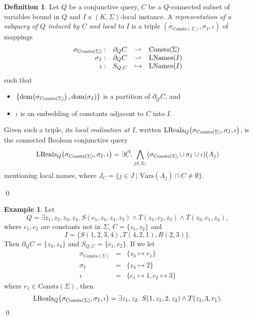 \documentclass[12pt]{report}
\theoremstyle{plain}
\theoremstyle{definition}
\newtheorem{definition}[theorem]{Definition}
\newtheorem{example}[theorem]{Example}
\def\Vars{{\mathrm{Vars}}}
\def\Consts{{\mathrm{Consts}}}
\newcommand{\dom}[1]{\ensuremath{\normalfont{\operatorname{dom}}\!\left( #1 \right)}}
\newcommand{\LNames}[1]{\ensuremath{\normalfont{\textrm{LNames}}\!\left( #1 \right)}}
\newcommand{\LRealz}[2]{\ensuremath{\normalfont{\textrm{LRealz}}_{ #1 }\!\left( #2 \right)}}
\begin{document}
\begin{definition}
  Let $Q$ be a conjunctive query, $C$ be a $Q$-connected subset of variables bound in $Q$ and $I$ a $(K, \Sigma)$-local instance. A \emph{representation of a subquery of $Q$ induced by $C$ and local to $I$} is a triple $(\sigma_{\Consts(\Sigma)}, \sigma_I, \iota)$ of mappings
  \[\begin{array}{rccl}
    \sigma_{\Consts(\Sigma)}: & \partial_Q C &\rightharpoonup& \Consts(\Sigma) \\
    \sigma_I: & \partial_Q C &\rightharpoonup& \LNames{I} \\
    \iota: & S_{Q,C} &\hookrightarrow& \LNames{I}
  \end{array}\]
  such that \begin{itemize}
    \item $\{ \dom{\sigma_{\Consts(\Sigma)}}, \dom{\sigma_I} \}$ is a partition of $\partial_Q C$, and
    \item $\iota$ is an embedding of constants adjacent to $C$ into $I$.
  \end{itemize}

  Given such a triple, its \emph{local realisation at $I$}, written $\LRealz{Q}{\sigma_{\Consts(\Sigma)}, \sigma_I, \iota}$, is the connected Boolean conjunctive query $$
  \LRealz{Q}{\sigma_{\Consts(\Sigma)}, \sigma_I, \iota} = \exists \vec{C}. \bigwedge_{j \in J_C} (\sigma_{\Consts(\Sigma)} \cup \sigma_I \cup \iota)(A_j)
  $$
  mentioning local names, where $J_C = \{ j \in J \mid \Vars(A_j) \cap C \neq \emptyset \}$.

  \qed
\end{definition}

\begin{example}
\label{example:local-realisation-of-subquery-representation}
  Let
  $$
    Q = \exists z_1,z_2,z_3,z_4.\ S(c_1, z_1, z_4, z_2) \wedge T(z_1, c_2, z_3) \wedge T(z_3, c_1, z_4),
  $$
  where $c_1, c_2$ are constants not in $\Sigma$, $C = \{z_1, z_2\}$ and $$I = \{ S(1, 2, 3, 4), T(4, 2, 1), R(2, 3) \}.$$
  Then $\partial_Q C = \{ z_3, z_4 \}$ and $S_{Q,C} = \{c_1, c_2\}$. If we let
  \[\begin{array}{rcl}
    \sigma_{\Consts(\Sigma)} &=& \{ z_3 \mapsto r_1 \} \\
    \sigma_I &=& \{ z_4 \mapsto 2 \} \\
    \iota &=& \{ c_1 \mapsto 1, c_2 \mapsto 3 \}
  \end{array}\]
  where $r_1 \in \Consts(\Sigma)$, then $$
  \LRealz{Q}{\sigma_{\Consts(\Sigma)}, \sigma_I, \iota} = \exists z_1, z_2.\ S(1, z_1, 2, z_2) \wedge T(z_1, 3, r_1).
  $$
  \qed
\end{example}
\end{document}

